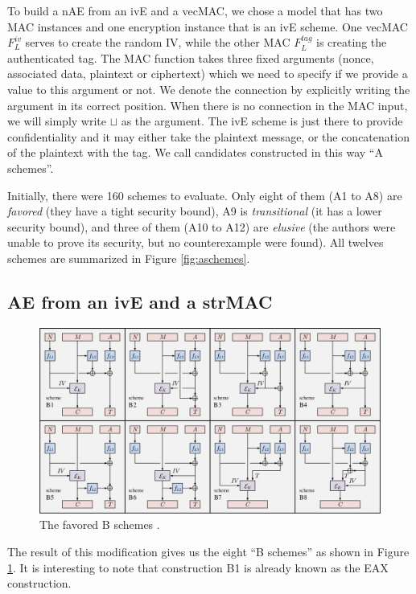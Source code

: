 \documentclass[10pt,a4paper]{article}
\begin{document}
To build a nAE from an ivE and a vecMAC, we chose a model that has two MAC instances and one encryption instance that is an ivE scheme.
One vecMAC $F^{iv}_L$ serves to create the random IV, while the other MAC $F^{tag}_L$ is creating the authenticated tag.
The MAC function takes three fixed arguments (nonce, associated data, plaintext or ciphertext) which we need to specify if we provide a value to this argument or not.
We denote the connection by explicitly writing the argument in its correct position.
When there is no connection in the MAC input, we will simply write $\sqcup$ as the argument.
The ivE scheme is just there to provide confidentiality and it may either take the plaintext message, or the concatenation of the plaintext with the tag.
We call candidates constructed in this way ``A schemes''.

Initially, there were 160 schemes to evaluate.
Only eight of them (A1 to A8) are \emph{favored} (they have a tight security bound), A9 is \emph{transitional} (it has a lower security bound), and three of them (A10 to A12) are \emph{elusive} (the authors were unable to prove its security, but no counterexample were found).
All twelves schemes are summarized in Figure \ref{fig:aschemes}.

\subsection{AE from an ivE and a strMAC}

\begin{figure}
	\centering \includegraphics[scale=0.25]{strmac.jpg}
	\caption{The favored B schemes \cite{namprempre2014reconsidering}.\label{fig:bschemes}}
\end{figure}

The result of this modification gives us the eight ``B schemes'' as shown in Figure \ref{fig:bschemes}.
It is interesting to note that construction B1 is already known as the EAX construction.
\end{document}
